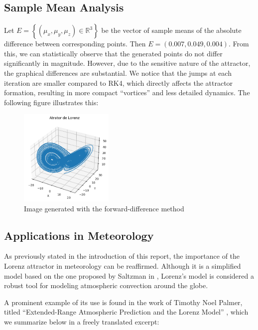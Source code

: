 \documentclass[12pt, a4paper]{article}
\begin{document}
	\subsection{Sample Mean Analysis}
	
	Let $E = \left\{(\mu_x, \mu_y, \mu_z) \in \mathbb{R}^3\right\}$ be the vector of sample means of the absolute difference between corresponding points. Then $E = (0.007, 0.049, 0.004)$. From this, we can statistically observe that the generated points do not differ significantly in magnitude. However, due to the sensitive nature of the attractor, the graphical differences are substantial. We notice that the jumps at each iteration are smaller compared to RK4, which directly affects the attractor formation, resulting in more compact “vortices” and less detailed dynamics. The following figure illustrates this:
	
	\begin{figure}[H]
		\centering
		\includegraphics[width=0.4\textwidth]{img/attrator10000_lorenz.png}
		\caption{Image generated with the forward-difference method}
		\label{fig:diff-prog}
	\end{figure}
	
	\subsection{Applications in Meteorology}
	
	As previously stated in the introduction of this report, the importance of the Lorenz attractor in meteorology can be reaffirmed. Although it is a simplified model based on the one proposed by Saltzman in \cite{Saltzman1962}, Lorenz’s model is considered a robust tool for modeling atmospheric convection around the globe.
	
	A prominent example of its use is found in the work of Timothy Noel Palmer, titled “Extended-Range Atmospheric Prediction and the Lorenz Model” \cite{Palmer1993}, which we summarize below in a freely translated excerpt:
	
\end{document}
